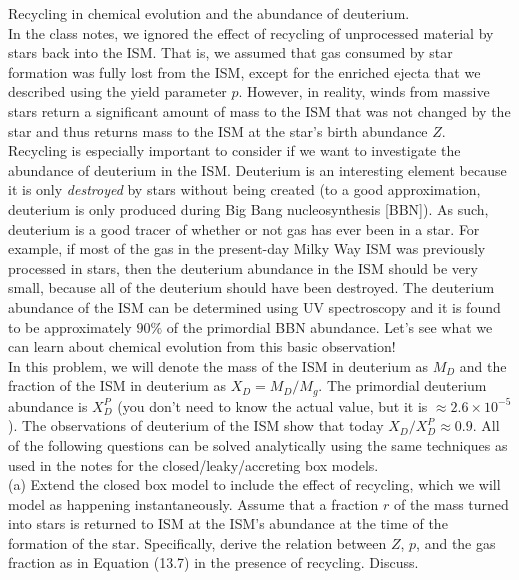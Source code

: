 \documentclass[12pt]{article}
\begin{document}
 Recycling in chemical evolution and the
abundance of deuterium.\\

In the class notes, we ignored the effect of recycling of unprocessed
material by stars back into the ISM. That is, we assumed that gas
consumed by star formation was fully lost from the ISM, except for the
enriched ejecta that we described using the yield parameter
$p$. However, in reality, winds from massive stars return a
significant amount of mass to the ISM that was not changed by the star
and thus returns mass to the ISM at the star's birth abundance $Z$.\\

Recycling is especially important to consider if we want to
investigate the abundance of deuterium in the ISM. Deuterium is an
interesting element because it is only \emph{destroyed} by stars
without being created (to a good approximation, deuterium is only
produced during Big Bang nucleosynthesis [BBN]). As such, deuterium is
a good tracer of whether or not gas has ever been in a star. For
example, if most of the gas in the present-day Milky Way ISM was
previously processed in stars, then the deuterium abundance in the ISM
should be very small, because all of the deuterium should have been
destroyed. The deuterium abundance of the ISM can be determined using
UV spectroscopy and it is found to be approximately $90\%$ of the
primordial BBN abundance. Let's see what we can learn about chemical
evolution from this basic observation!\\

In this problem, we will denote the mass of the ISM in deuterium as
$M_D$ and the fraction of the ISM in deuterium as $X_D = M_D/M_g$. The
primordial deuterium abundance is $X_D^P$ (you don't need to know the
actual value, but it is $\approx 2.6\times 10^{-5}$). The observations
of deuterium of the ISM show that today $X_D/X_D^P \approx 0.9$. All
of the following questions can be solved analytically using the same
techniques as used in the notes for the closed/leaky/accreting box
models.\\

(a) Extend the closed box model to include the effect of recycling,
which we will model as happening instantaneously. Assume that a
fraction $r$ of the mass turned into stars is returned to ISM at the
ISM's abundance at the time of the formation of the
star. Specifically, derive the relation between $Z$, $p$, and the gas
fraction as in Equation (13.7) in the presence of
recycling. Discuss.\\
\end{document}
